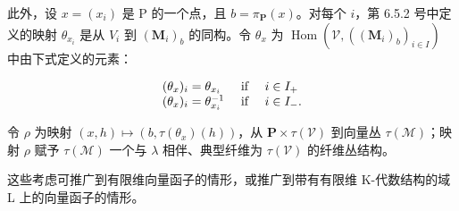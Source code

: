 此外，设 \(x = (x_i)\) 是 P 的一个点，且 \(b = \pi_{\mathbf{P}}(x)\)。对每个 \(i\)，第 6.5.2 号中定义的映射 \(\theta_{x_i}\) 是从 \(V_i\) 到 \((\mathbf{M}_i)_b\) 的同构。令 \(\theta_x\) 为 \(\operatorname{Hom}(\mathcal{V}, ((\mathbf{M}_i)_b)_{i \in I})\) 中由下式定义的元素：

\[
\begin{array}{l l} (\theta_ {x}) _ {i} = \theta_ {x _ {i}} & \text { if } \quad i \in I _ {+} \\ (\theta_ {x}) _ {i} = \theta_ {x _ {i}} ^ {- 1} & \text { if } \quad i \in I _ {-}. \end{array}
\]

令 \(\rho\) 为映射 \((x, h) \mapsto (b, \tau(\theta_x)(h))\)，从 \(\mathbf{P} \times \tau(\mathcal{V})\) 到向量丛 \(\tau(\mathcal{M})\)；映射 \(\rho\) 赋予 \(\tau(\mathcal{M})\) 一个与 \(\lambda\) 相伴、典型纤维为 \(\tau(\mathcal{V})\) 的纤维丛结构。

这些考虑可推广到有限维向量函子的情形，或推广到带有有限维 K-代数结构的域 L 上的向量函子的情形。

